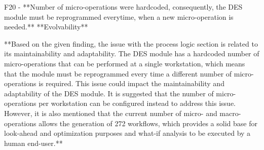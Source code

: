 \documentclass{llncs}
\begin{document}
    F20 - **Number of micro-operations were hardcoded, consequently, the DES module must be reprogrammed everytime, when a new micro-operation is needed.** 
    **Evolvability**

    **Based on the given finding, the issue with the process logic section is related to its maintainability and adaptability. 
    The DES module has a hardcoded number of micro-operations that can be performed at a single workstation, which means that the module must be reprogrammed every time 
    a different number of micro-operations is required. This issue could impact the maintainability and adaptability of the DES module. It is suggested that the number of 
    micro-operations per workstation can be configured instead to address this issue. However, it is also mentioned that the current number of micro- 
    and macro-operations allows the generation of 272 workflows, which provides a solid base for look-ahead and optimization purposes and what-if analysis to be executed by a human end-user.**
    

    
\end{document}
